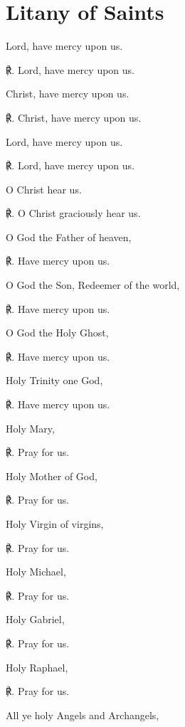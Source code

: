 \section{Litany of Saints}\label{LitanySaints}
\fancyhead[RE,LO]{}

\vspace{-1\baselineskip}

\begin{multicols}{2}
\par\noindent
Lord, have mercy upon us.\par
℟. Lord, have mercy upon us.\par\noindent
Christ, have mercy upon us.\par
℟. Christ, have mercy upon us.\par\noindent
Lord, have mercy upon us.\par
℟. Lord, have mercy upon us.\par\noindent
O Christ hear us.\par
℟. O Christ graciously hear us.\par\noindent
O God the Father of heaven,\par
℟. Have mercy upon us.\par\noindent
O God the Son, Redeemer of the world,\par
℟. Have mercy upon us.\par\noindent
O God the Holy Ghost,\par
℟. Have mercy upon us.\par\noindent
Holy Trinity one God,\par
℟. Have mercy upon us.\par\noindent
Holy Mary,\par
℟. Pray for us.\par\noindent
Holy Mother of God,\par
℟. Pray for us.\par\noindent
Holy Virgin of virgins,\par
℟. Pray for us.\par\noindent
Holy Michael,\par
℟. Pray for us.\par\noindent
Holy Gabriel,\par
℟. Pray for us.\par\noindent
Holy Raphael,\par
℟. Pray for us.\par\noindent
All ye holy Angels and Archangels,\par

\end{multicols}
